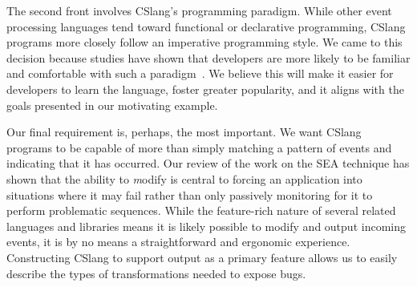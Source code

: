 The second front involves CSlang's programming paradigm.
While other event processing languages tend toward functional or
declarative programming,
CSlang programs more closely follow an imperative programming style.
We came to this decision because studies
have shown that developers are more likely to be familiar and comfortable
with such a paradigm~\cite{XXXX}.  We believe this will make it easier for
developers to learn the language, foster greater popularity, and it aligns
with the goals presented in our motivating example.

Our final requirement is, perhaps, the most important.
We want CSlang programs to be capable of more than simply matching
a pattern of events and indicating that it has occurred.
Our review of the work on the SEA technique has shown that the ability to
{\textit modify} is central to forcing an application into situations where
it may fail rather than only passively monitoring for it to perform
problematic sequences.  While the feature-rich nature of several related
languages and libraries means it is likely possible to modify and output
incoming events, it is by no means a straightforward
and ergonomic experience.
Constructing CSlang to support output as a primary feature allows us to
easily describe the types of transformations needed to expose bugs.


